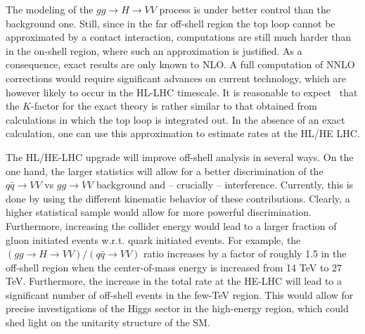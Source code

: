 The modeling of the $gg\to H\to VV$ process is under better control than the background one. 
Still, since
in the far off-shell region the top loop cannot be approximated by a contact interaction,
computations are still much harder than in the on-shell region, where such an approximation is justified. As a consequence, exact results are
only known to NLO. A full computation of NNLO corrections would require significant advances on 
current technology, which are however likely to occur in the HL-LHC timescale. It is reasonable
to expect~\cite{deFlorian:2016spz} 
that the $K$-factor for the exact theory is rather similar to that obtained from calculations in which
the top loop is integrated out. In the absence of an exact calculation, one can use this 
approximation to estimate rates at the HL/HE LHC. 

The HL/HE-LHC upgrade will improve off-shell analysis in several ways. On the one hand,
the larger statistics will allow for a better discrimination of the $q\bar q\to VV$ vs
$gg\to VV$ background and -- crucially -- interference. Currently, this is done by using
the different kinematic behavior of these contributions. Clearly, a higher statistical
sample would allow for more powerful discrimination. Furthermore, increasing the collider
energy would lead to a larger fraction of gluon initiated events w.r.t. quark initiated
events. For example, the $(gg\to H\to VV)/(q\bar q\to VV)$ ratio increases by a factor of roughly
1.5 in the off-shell region when the center-of-mass energy is increased from 14 TeV to 27 TeV. Furthermore, the increase in the total rate at the HE-LHC
will lead to a significant number of off-shell events in the few-TeV region. This would
allow for precise investigations of the Higgs sector in the high-energy region, which could 
shed light on the unitarity structure of the SM. 